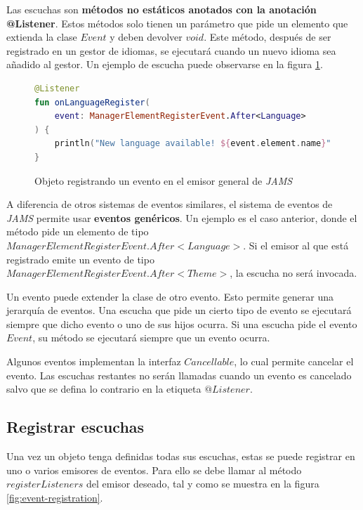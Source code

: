 Las escuchas son \textbf{métodos no estáticos anotados con la anotación @Listener}.
Estos métodos solo tienen un parámetro que pide un elemento que extienda la clase
$Event$ y deben devolver $void$.
Este método, después de ser registrado en un gestor de idiomas,
se ejecutará cuando un nuevo idioma sea añadido al gestor.
Un ejemplo de escucha puede observarse en la figura \ref{fig:listener}.

\begin{figure}[h]
    \centering
    \begin{lstlisting}[frame=single,label={lst:listener},language=Kotlin]
@Listener
fun onLanguageRegister(
    event: ManagerElementRegisterEvent.After<Language>
) {
    println("New language available! ${event.element.name}")
}
    \end{lstlisting}
    \caption{Objeto registrando un evento en el emisor general de \textit{JAMS}}
    \label{fig:listener}
\end{figure}

 A diferencia de otros sistemas de eventos similares,
el sistema de eventos de \textit{JAMS} permite usar \textbf{eventos genéricos}.
Un ejemplo es el caso anterior, donde el método pide un elemento de tipo
$ManagerElementRegisterEvent.After<Language>$.
Si el emisor al que está registrado emite un evento de tipo
$ManagerElementRegisterEvent.After<Theme>$, la escucha no será invocada.

 Un evento puede extender la clase de otro evento.
Esto permite generar una jerarquía de eventos.
Una escucha que pide un cierto tipo de evento se ejecutará siempre que dicho evento o uno de sus hijos ocurra.
Si una escucha pide el evento $Event$, su método se ejecutará siempre que un evento ocurra.

 Algunos eventos implementan la interfaz $Cancellable$, lo cual permite cancelar el evento.
Las escuchas restantes no serán llamadas cuando un evento es cancelado salvo que se defina lo contrario
en la etiqueta $@Listener$.

\subsection{Registrar escuchas}\label{subsec:registrar-escuchas}

Una vez un objeto tenga definidas todas sus escuchas, estas
se puede registrar en uno o varios emisores de eventos.
Para ello se debe llamar al método $registerListeners$ del
emisor deseado, tal y como se muestra en la figura \ref{fig:event-registration}.

